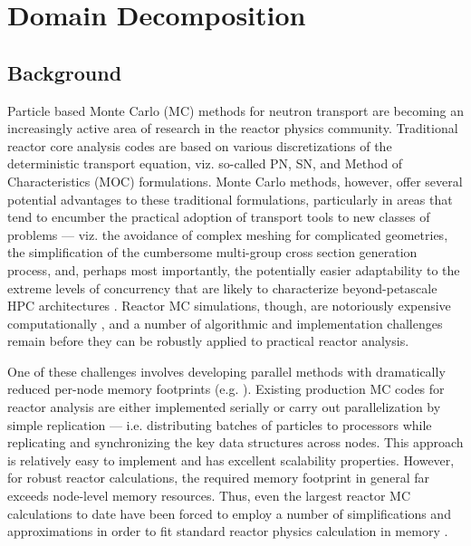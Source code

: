 \chapter{Domain Decomposition}
\label{chap:domain-decomp}

\newcommand{\lave}{\langle \lambda \rangle}
\newcommand{\lmave}{\langle \overline{\lambda} \rangle}
\newcommand{\lroot}{\| \lambda \|}
\newcommand{\deltap}{\delta{p_{i,j}}}
\newcommand{\dpmax}{\delta{p_i^{max}}}
\newcommand{\pmax}{{p_i^{max}}}
\newcommand{\lmax}{{\lambda_i^{max}}}
\newcommand{\pbar}{\overline{P}}
\newcommand{\xx}{\frac{\beta ||\lambda^{max}|| + \mu}{\beta
    ||\overline{\lambda}|| + \mu} }
\newcommand{\yy}{ \frac{\sum_{i=0}^M ||{\lambda^{max}}||^i}{\sum_{i=0}^M
    ||\overline{\lambda}||^i} }

\section{Background}
Particle based Monte Carlo (MC) methods for neutron transport are becoming an
increasingly active area of research in the reactor physics
community. Traditional reactor core analysis codes are based on various
discretizations of the deterministic transport equation, viz. so-called PN, SN,
and Method of Characteristics (MOC) formulations. Monte Carlo methods, however,
offer several potential advantages to these traditional formulations,
particularly in areas that tend to encumber the practical adoption of transport
tools to new classes of problems --- viz. the avoidance of complex meshing for
complicated geometries, the simplification of the cumbersome multi-group cross
section generation process, and, perhaps most importantly, the potentially
easier adaptability to the extreme levels of concurrency that are likely to
characterize beyond-petascale HPC architectures \cite{jkns-chang-2009}. Reactor
MC simulations, though, are notoriously expensive computationally
\cite{mc-hoogenboom-2009, pnst-wagner-2011, physor-kelly-2010}, and a number of
algorithmic and implementation challenges remain before they can be robustly
applied to practical reactor analysis.

One of these challenges involves developing parallel methods with dramatically
reduced per-node memory footprints (e.g. \cite{pnst-romano-2011}). Existing
production MC codes for reactor analysis are either implemented serially or
carry out parallelization by simple replication --- i.e. distributing batches of
particles to processors while replicating and synchronizing the key data
structures across nodes. This approach is relatively easy to implement and has
excellent scalability properties. However, for robust reactor calculations, the
required memory footprint in general far exceeds node-level memory
resources. Thus, even the largest reactor MC calculations to date have been
forced to employ a number of simplifications and approximations in order to fit
standard reactor physics calculation in memory \cite{physor-kelly-2010}.

